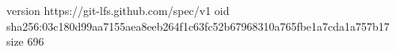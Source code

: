 version https://git-lfs.github.com/spec/v1
oid sha256:03c180d99aa7155aea8eeb264f1c63fc52b67968310a765fbe1a7cda1a757b17
size 696
